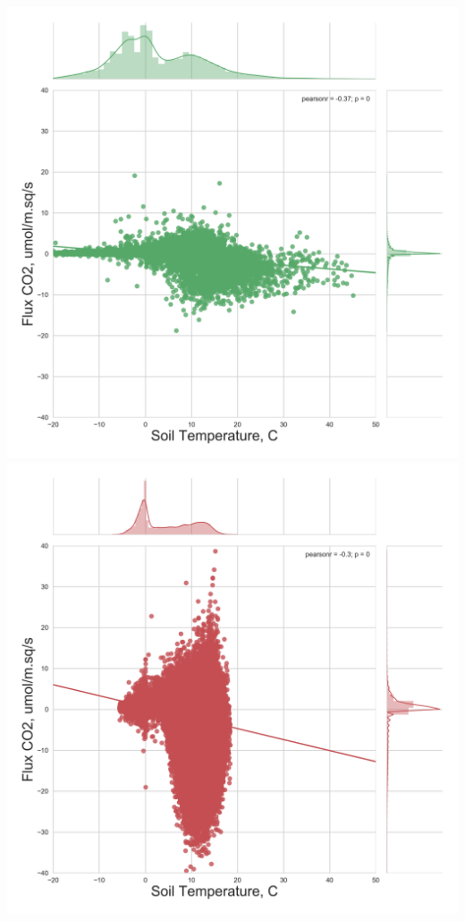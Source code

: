 \documentclass{beamer}
\begin{document}
\begin{frame}
\begin{columns}[t]
\includegraphics[width=\textwidth]{FvsT/CA-NS6.png}\\
\includegraphics[width=\textwidth]{FvsT/CA-Oas.png}

\end{columns}
\end{frame}
\end{document}

